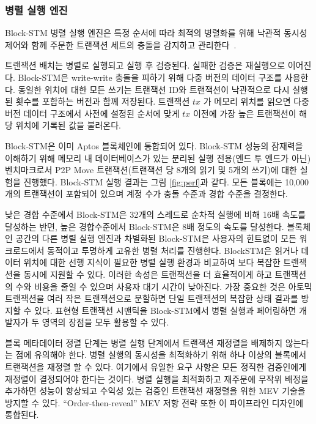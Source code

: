 \documentclass{article}
\begin{document}
\subsubsection{병렬 실행 엔진}

Block-STM 병렬 실행 엔진은 특정 순서에 따라 최적의 병렬화를 위해 낙관적 동시성 제어와 함께 주문한 트랜잭션 세트의 충돌을 감지하고 관리한다~\cite{block_stm}.

트랜잭션 배치는 병렬로 실행되고 실행 후 검증된다. 실패한 검증은 재실행으로 이어진다. Block-STM은 write-write 충돌을 피하기 위해 다중 버전의 데이터 구조를 사용한다. 동일한 위치에 대한 모든 쓰기는 트랜잭션 ID와 트랜잭션이 낙관적으로 다시 실행된 횟수를 포함하는 버전과 함께 저장된다. 트랜잭션 $tx$ 가 메모리 위치를 읽으면 다중 버전 데이터 구조에서 사전에 설정된 순서에 맞게 $tx$ 이전에 가장 높은 트랜잭션이 해당 위치에 기록된 값을 불러온다.

Block-STM은 이미 Aptos 블록체인에 통합되어 있다. Block-STM 성능의 잠재력을 이해하기 위해 메모리 내 데이터베이스가 있는 분리된 실행 전용(엔드 투 엔드가 아닌) 벤치마크로서 P2P Move 트랜잭션(트랜잭션 당 8개의 읽기 및 5개의 쓰기)에 대한 실험을 진행했다. Block-STM 실행 결과는 그림 \ref{fig:perf}과 같다. 모든 블록에는 10,000개의 트랜잭션이 포함되어 있으며 계정 수가 충돌 수준과 경합 수준을 결정한다.

낮은 경합 수준에서 Block-STM은 32개의 스레드로 순차적 실행에 비해 16배 속도를 달성하는 반면, 높은 경합수준에서 Block-STM은 8배 정도의 속도를 달성한다. 블록체인 공간의 다른 병렬 실행 엔진과 차별화된 Block-STM은 사용자의 힌트없이 모든 워크로드에서 동적이고 투명하게 고유한 병렬 처리를 진행한다. BlockSTM은 읽거나 데이터 위치에 대한 선행 지식이 필요한 병렬 실행 환경과 비교하여 보다 복잡한 트랜잭션을 동시에 지원할 수 있다. 이러한 속성은 트랜잭션을 더 효율적이게 하고 트랜잭션의 수와 비용을 줄일 수 있으며 사용자 대기 시간이 낮아진다. 가장 중요한 것은 아토믹 트랜잭션을 여러 작은 트랜잭션으로 분할하면 단일 트랜잭션의 복잡한 상태 결과를 방지할 수 있다. 표현형 트랜잭션 시맨틱을 Block-STM에서 병렬 실행과 페어링하면 개발자가 두 영역의 장점을 모두 활용할 수 있다.

블록 메타데이터 정렬 단계는 병렬 실행 단계에서 트랜잭션 재정렬을 배제하지 않는다는 점에 유의해야 한다. 병렬 실행의 동시성을 최적화하기 위해 하나 이상의 블록에서 트랜잭션을 재정렬 할 수 있다. 여기에서 유일한 요구 사항은 모든 정직한 검증인에게 재정렬이 결정되어야 한다는 것이다. 병렬 실행을 최적화하고 재주문에 무작위 배정을 추가하면 성능이 향상되고 수익성 있는 검증인 트랜잭션 재정렬을 위한 MEV 기술을 방지할 수 있다. ``Order-then-reveal'' MEV 저항 전략 또한 이 파이프라인 디자인에 통합된다.
\end{document}
